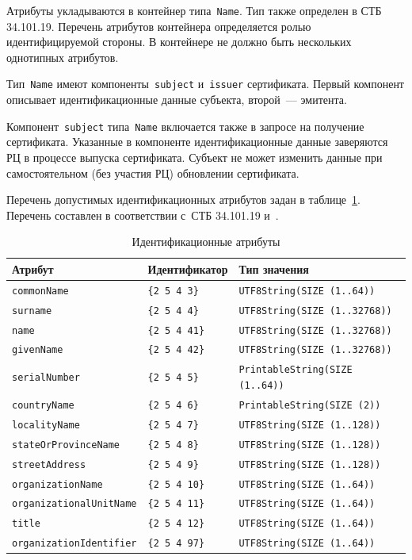 Атрибуты укладываются в контейнер типа~\texttt{Name}. Тип также определен в 
СТБ 34.101.19. Перечень атрибутов контейнера определяется ролью идентифицируемой 
стороны. В контейнере не должно быть нескольких однотипных атрибутов.

Тип~\texttt{Name} имеют компоненты~\texttt{subject} и~\texttt{issuer} 
сертификата. Первый компонент описывает идентификационные данные субъекта, 
второй~--- эмитента.

Компонент~\texttt{subject} типа~\texttt{Name} включается также в запросе 
на получение сертификата. Указанные в компоненте идентификационные данные
заверяются РЦ в процессе выпуска сертификата. Субъект не может изменить 
данные при самостоятельном (без участия РЦ) обновлении сертификата. 

Перечень допустимых идентификационных атрибутов задан в 
таблице~\ref{Table.ENTITIES.Attrs}. Перечень составлен в соответствии 
с~СТБ 34.101.19 и~\cite{X520}.  

\begin{table}[bht]
\caption{Идентификационные атрибуты}
\label{Table.ENTITIES.Attrs}
\begin{tabular}{|l|l|l|}
\hline
Атрибут & Идентификатор & Тип значения\\
\hline
\hline
\texttt{commonName} & \verb|{2 5 4 3}| & \texttt{UTF8String(SIZE (1..64))}\\
\texttt{surname} & \verb|{2 5 4 4}| & \texttt{UTF8String(SIZE (1..32768))}\\
\texttt{name} & \verb|{2 5 4 41}| & \texttt{UTF8String(SIZE (1..32768))}\\
\texttt{givenName} & \verb|{2 5 4 42}| & \texttt{UTF8String(SIZE (1..32768))}\\
\texttt{serialNumber} & \verb|{2 5 4 5}| & \texttt{PrintableString(SIZE (1..64))}\\
\texttt{countryName} & \verb|{2 5 4 6}| & \texttt{PrintableString(SIZE (2))}\\
\texttt{localityName} & \verb|{2 5 4 7}| & \texttt{UTF8String(SIZE (1..128))}\\
\texttt{stateOrProvinceName} & \verb|{2 5 4 8}| & \texttt{UTF8String(SIZE (1..128))}\\
\texttt{streetAddress} & \verb|{2 5 4 9}| & \texttt{UTF8String(SIZE (1..128))}\\
\texttt{organizationName} & \verb|{2 5 4 10}| & \texttt{UTF8String(SIZE (1..64))}\\
\texttt{organizationalUnitName} & \verb|{2 5 4 11}| & \texttt{UTF8String(SIZE (1..64))}\\
\texttt{title} & \verb|{2 5 4 12}| & \texttt{UTF8String(SIZE (1..64))}\\
\texttt{organizationIdentifier} & \verb|{2 5 4 97}| & \texttt{UTF8String(SIZE (1..64))}\\
\hline                                      
\end{tabular}
\end{table}

